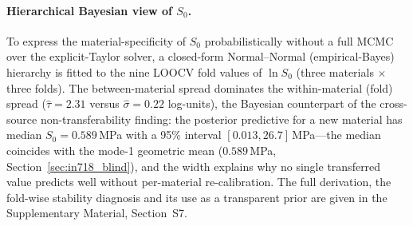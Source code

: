 \documentclass[12pt,a4paper,twocolumn]{article}
\begin{document}
\paragraph{Hierarchical Bayesian view of $S_0$.}
To express the material-specificity of $S_0$ probabilistically without a full MCMC over the explicit-Taylor solver, a closed-form Normal--Normal (empirical-Bayes) hierarchy is fitted to the nine LOOCV fold values of $\ln S_0$ (three materials $\times$ three folds). The between-material spread dominates the within-material (fold) spread ($\hat\tau = 2.31$ versus $\hat\sigma = 0.22$ log-units), the Bayesian counterpart of the cross-source non-transferability finding: the posterior predictive for a new material has median $S_0 = 0.589$\,MPa with a 95\% interval $[0.013, 26.7]$\,MPa---the median coincides with the mode-1 geometric mean ($0.589$\,MPa, Section~\ref{sec:in718_blind}), and the width explains why no single transferred value predicts well without per-material re-calibration. The full derivation, the fold-wise stability diagnosis and its use as a transparent prior are given in the Supplementary Material, Section~S7.
\end{document}
